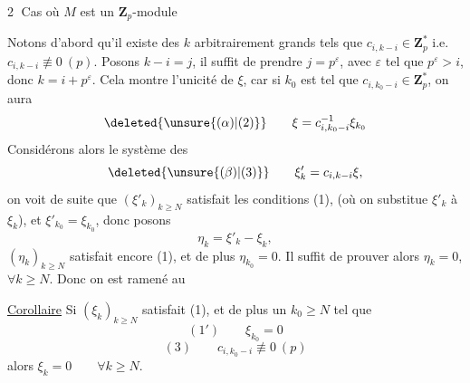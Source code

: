 \textcircled{2} Cas où $M$ est un $\mathbf Z_p$-module

Notons d'abord qu'il existe des $k$ arbitrairement grands tels que $c_{i,k-i}\in\mathbf Z_p^*$ i.e. $c_{i,k-i}\not\equiv0\ (p)$. Posons $k-i=j$, il suffit de prendre $j=p^\varepsilon$, avec $\varepsilon$ tel que $p^\varepsilon>i$, donc $k=i+p^\varepsilon$. Cela montre l'unicité de $\xi$, car si $k_0$ est tel que $c_{i,k_0-i}\in\mathbf Z_p^*$, on aura
\[
\deleted{\unsure{(\alpha)|(2)}}\qquad\xi=c_{i,k_0-i}^{-1}\xi_{k_0}
\]
Considérons alors le système des
\[
\deleted{\unsure{(\beta)|(3)}}\qquad\xi'_k=c_{i,k-i}\xi,
\]
on voit de suite  que  $(\xi'_k)_{k\geq N}$ satisfait les conditions (1), (où on substitue $\xi'_k$ à $\xi_k$), et $\xi'_{k_0}=\xi_{k_0}$, donc posons
\[
\eta_k=\xi'_k-\xi_k,
\]
 $(\eta_k)_{k\geq N}$ satisfait encore (1), et de plus $\eta_{k_0}=0$. Il suffit de prouver alors $\eta_k=0$,  $\forall k\geq N$. Donc on est ramené au

\uline{Corollaire} Si $(\xi_k)_{k\geq N}$  satisfait (1), et  de plus   un $k_0\geq N$ tel que
\[
(1')\qquad\xi_{k_0}=0
\]
\[
(3)\qquad c_{i,k_0-i}\not\equiv0\ (p)
\]
alors $\xi_k=0\qquad\forall k\geq N$.

